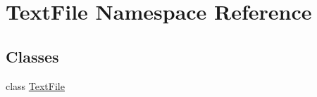 \hypertarget{namespace_text_file}{\section{Text\-File Namespace Reference}
\label{namespace_text_file}
}
\subsection*{Classes}
\begin{DoxyCompactItemize}
\item 
class \hyperlink{class_text_file_1_1_text_file}{Text\-File}
\end{DoxyCompactItemize}
